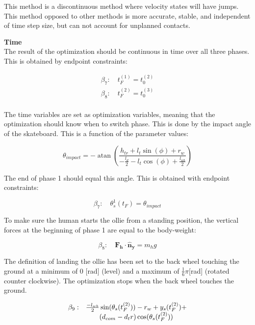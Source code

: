 \documentclass[default,iicol]{sn-jnl}
\theoremstyle{thmstyleone}%
\theoremstyle{thmstyletwo}%
\theoremstyle{thmstylethree}%
\begin{document}
This method is a discontinuous method where velocity states will have jumps. This method opposed to other methods is more accurate, stable, and independent of time step size, but can not account for unplanned contacts\cite{ackermann_optimality_2010}. 

\textbf{Time}\\
The result of the optimization should be continuous in time over all three phases. This is obtained by endpoint constraints: 

\begin{equation}
    \begin{array}{c}
         \beta_7: \quad t_F^{(1)} = t_0^{(2)}  \\
         \beta_8: \quad t_F^{(2)} = t_0^{(3)}  \\
    \end{array}
\end{equation}

The time variables are set as optimization variables, meaning that the optimization should know when to switch phase. This is done by the impact angle of the skateboard. This is a function of the parameter values:

\begin{equation}
    \theta_{impact} = -\operatorname{atan}\left(\frac{h_{t r}+l_t \sin (\phi)+r_w}{-\frac{l_d}{2}-l_t \cos (\phi)+\frac{l_{w b}}{2}}\right)
\end{equation}

The end of phase 1 should equal this angle. This is obtained with endpoint constraints:

\begin{equation}
    \beta_7: \quad \theta_s^{1}(t_F) = \theta_{impact}
\end{equation}

To make sure the human starts the ollie from a standing position, the vertical forces at the beginning of phase 1 are equal to the body-weight:

\begin{equation}
    \beta_8: \quad \mathbf{F_h} \cdot \mathbf{\hat n_y} = m_h g
\end{equation}

The definition of landing the ollie has been set to the back wheel touching the ground at a minimum of 0 [rad] (level) and a maximum of $\frac{1}{6} \pi$[rad] (rotated counter clockwise). The optimization stops when the back wheel touches the ground.

\begin{equation}
\begin{array}{l c}
\beta_9 : & \frac{-l_{wb}}{2} \sin(\theta_s(t_F^{(2)})) - r_w + y_s(t_F^{(2)}) + \\ 
& (d_{com} - {d_tr}) \cos(\theta_s(t_F^{(2)}))
\end{array}
\end{equation}
\end{document}
